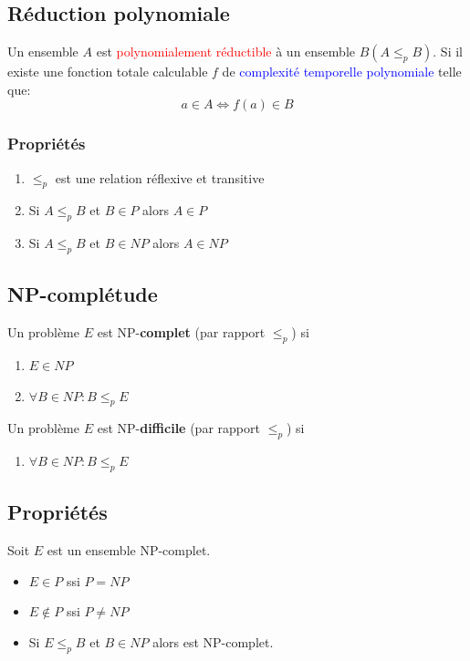 \documentclass{report}
\begin{document}
\subsection{Réduction polynomiale}
Un ensemble $A$ est \textcolor{red}{polynomialement réductible} à un ensemble $B ( A \leq_p B)$. Si il existe une fonction totale calculable $f$ de \textcolor{blue}{complexité temporelle polynomiale} telle que:
\begin{equation}
a \in A \Leftrightarrow f(a) \in B
\end{equation}

\subsubsection{Propriétés}
\begin{enumerate}
\item $\leq_p$ est une relation réflexive et transitive
\item Si $A \leq_p B$ et $B \in P$ alors $A \in P$
\item Si $A \leq_p B$ et $B \in NP$ alors $A \in NP$
\end{enumerate}

\subsection{NP-complétude}
Un problème $E$ est NP-\textbf{complet} (par rapport $\leq_p$) si
\begin{enumerate}
\item $E \in NP$
\item $\forall B \in NP: B \leq_p E$ 
\end{enumerate}
Un problème $E$ est NP-\textbf{difficile} (par rapport $\leq_p$) si 
\begin{enumerate}
\item $\forall B \in NP: B \leq_p E$
\end{enumerate}

\subsection{Propriétés}
Soit $E$ est un ensemble NP-complet.
\begin{itemize}
\item $E \in P$ ssi $P = NP$
\item $E \notin P$ ssi $P \neq NP$
\item Si $E \leq_p B$ et $B \in NP$ alors est NP-complet.
\end{itemize}
\end{document}
